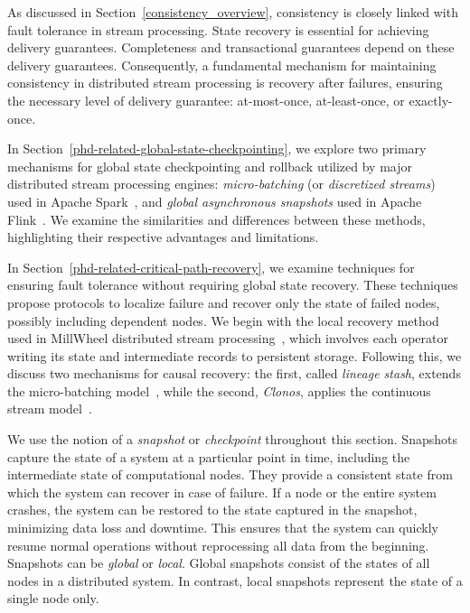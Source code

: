 As discussed in Section~\ref{consistency_overview}, consistency is closely linked with fault tolerance in stream processing. State recovery is essential for achieving delivery guarantees. Completeness and transactional guarantees depend on these delivery guarantees. Consequently, a fundamental mechanism for maintaining consistency in distributed stream processing is recovery after failures, ensuring the necessary level of delivery guarantee: at-most-once, at-least-once, or exactly-once.

In Section~\ref{phd-related-global-state-checkpointing}, we explore two primary mechanisms for global state checkpointing and rollback utilized by major distributed stream processing engines: {\em micro-batching} (or {\em discretized streams}) used in Apache Spark~\cite{Zaharia:2012:DSE:2342763.2342773}, and {\em global asynchronous snapshots} used in Apache Flink~\cite{2015arXiv150608603C, Carbone:2017:SMA:3137765.3137777}. We examine the similarities and differences between these methods, highlighting their respective advantages and limitations.

In Section~\ref{phd-related-critical-path-recovery}, we examine techniques for ensuring fault tolerance without requiring global state recovery. These techniques propose protocols to localize failure and recover only the state of failed nodes, possibly including dependent nodes. We begin with the local recovery method used in MillWheel distributed stream processing~\cite{Akidau:2013:MFS:2536222.2536229}, which involves each operator writing its state and intermediate records to persistent storage. Following this, we discuss two mechanisms for causal recovery: the first, called {\em lineage stash}, extends the micro-batching model~\cite{Wang:2019:LSF:3341301.3359653}, while the second, {\em Clonos}, applies the continuous stream model~\cite{silvestre2021clonos}.

We use the notion of a {\em snapshot} or {\em checkpoint} throughout this section. Snapshots capture the state of a system at a particular point in time, including the intermediate state of computational nodes. They provide a consistent state from which the system can recover in case of failure. If a node or the entire system crashes, the system can be restored to the state captured in the snapshot, minimizing data loss and downtime. This ensures that the system can quickly resume normal operations without reprocessing all data from the beginning. Snapshots can be {\em global} or {\em local}. Global snapshots consist of the states of all nodes in a distributed system. In contrast, local snapshots represent the state of a single node only.

